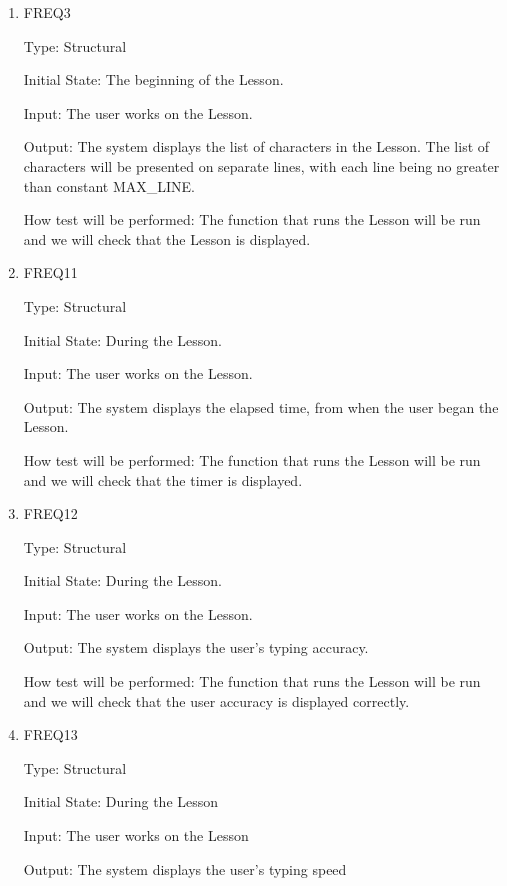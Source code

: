 \documentclass[12pt, titlepage]{article}
\begin{document}
\begin{enumerate}


\item{FREQ3\\}

Type: Structural
					
Initial State: The beginning of the Lesson.
					
Input: The user works on the Lesson.
					
Output: The system displays the list of characters in the Lesson. The list of characters will be presented on separate lines, with each line being no greater than constant MAX\_LINE.

					
How test will be performed: The function that runs the Lesson will be run and we will check that the Lesson is displayed.

\item{FREQ11\\}

Type: Structural
					
Initial State: During the Lesson.
					
Input: The user works on the Lesson.
					
Output: The system displays the elapsed time, from when the user began the Lesson.
					
How test will be performed:  The function that runs the Lesson will be run and we will check that the timer is displayed.

\item{FREQ12\\}

Type: Structural
					
Initial State: During the Lesson.
					
Input: The user works on the Lesson.
					
Output: The system displays the user's typing accuracy.
					
How test will be performed:  The function that runs the Lesson will be run and we will check that the user accuracy is displayed correctly. 

\item{FREQ13\\}

Type: Structural
					
Initial State: During the Lesson
					
Input: The user works on the Lesson
					
Output: The system displays the user's typing speed
					

\end{enumerate}
\end{document}
